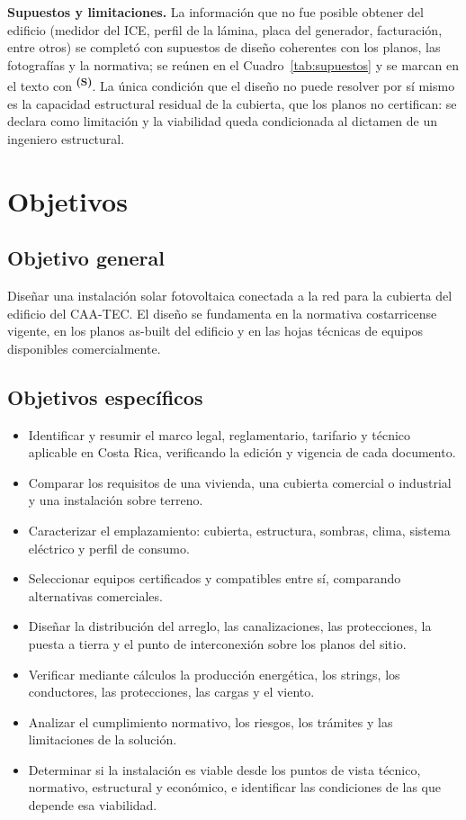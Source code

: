 \documentclass[12pt]{article}
\newcommand{\supuesto}{\textsuperscript{\textcolor{orange!80!black}{\textbf{(S)}}}}
\begin{document}
\textbf{Supuestos y limitaciones.} La información que no fue posible obtener del edificio (medidor del ICE, perfil de la lámina, placa del generador, facturación, entre otros) se completó con supuestos de diseño coherentes con los planos, las fotografías y la normativa; se reúnen en el Cuadro~\ref{tab:supuestos} y se marcan en el texto con \supuesto{}. La única condición que el diseño no puede resolver por sí mismo es la capacidad estructural residual de la cubierta, que los planos no certifican: se declara como limitación y la viabilidad queda condicionada al dictamen de un ingeniero estructural.

\section{Objetivos}
\subsection{Objetivo general}
Diseñar una instalación solar fotovoltaica conectada a la red para la cubierta del edificio del CAA-TEC. El diseño se fundamenta en la normativa costarricense vigente, en los planos as-built del edificio y en las hojas técnicas de equipos disponibles comercialmente.

\subsection{Objetivos específicos}
\begin{itemize}[leftmargin=1.2cm]
\item Identificar y resumir el marco legal, reglamentario, tarifario y técnico aplicable en Costa Rica, verificando la edición y vigencia de cada documento.
\item Comparar los requisitos de una vivienda, una cubierta comercial o industrial y una instalación sobre terreno.
\item Caracterizar el emplazamiento: cubierta, estructura, sombras, clima, sistema eléctrico y perfil de consumo.
\item Seleccionar equipos certificados y compatibles entre sí, comparando alternativas comerciales.
\item Diseñar la distribución del arreglo, las canalizaciones, las protecciones, la puesta a tierra y el punto de interconexión sobre los planos del sitio.
\item Verificar mediante cálculos la producción energética, los strings, los conductores, las protecciones, las cargas y el viento.
\item Analizar el cumplimiento normativo, los riesgos, los trámites y las limitaciones de la solución.
\item Determinar si la instalación es viable desde los puntos de vista técnico, normativo, estructural y económico, e identificar las condiciones de las que depende esa viabilidad.
\end{itemize}
\end{document}
